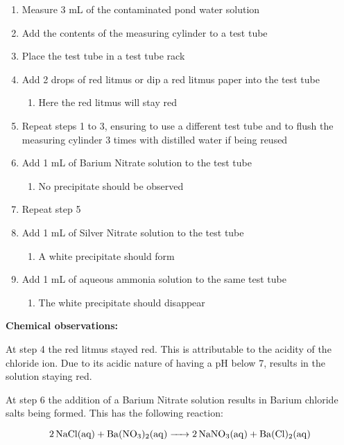 \documentclass[11pt, a4]{article}
\begin{document}
					\begin{enumerate}
						\item Measure 3 mL of the contaminated pond water solution
						\item Add the contents of the measuring cylinder to a test tube
						\item Place the test tube in a test tube rack
						\item Add 2 drops of red litmus or dip a red litmus paper into the test tube
							\begin{enumerate}
								\item Here the red litmus will stay red
							\end{enumerate}
						\item Repeat steps 1 to 3, ensuring to use a different test tube and to flush the measuring cylinder 3 times with distilled water if being reused
						\item Add 1 mL of Barium Nitrate solution to the test tube
							\begin{enumerate}
								\item No precipitate should be observed
							\end{enumerate}
						\item Repeat step 5
						\item Add 1 mL of Silver Nitrate solution to the test tube
						\begin{enumerate}
							\item A white precipitate should form
						\end{enumerate}
						\item Add 1 mL of aqueous ammonia solution to the same test tube
							\begin{enumerate}
								\item The white precipitate should disappear
							\end{enumerate}
					\end{enumerate}
				
					\noindent \textbf{Chemical observations:}

					At step 4 the red litmus stayed red. This is attributable to the acidity of the chloride ion. Due to its acidic nature of having a pH below 7, results in the solution staying red.

					At step 6 the addition of a Barium Nitrate solution results in Barium chloride salts being formed. This has the following reaction:

					\begin{equation}
						\ce{2NaCl{(aq)} + Ba(NO_3)_2(aq) -> 2NaNO3(aq) + Ba(Cl)_2(aq)}
					\end{equation}
\end{document}
